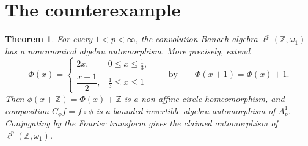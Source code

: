 \documentclass[11pt]{article}
\newtheorem{theorem}{Theorem}
\newcommand{\Z}{\mathbb Z}
\begin{document}
\section{The counterexample}

\begin{theorem}\label{thm:main}
For every $1<p<\infty$, the convolution Banach algebra
$\ell^p(\Z,\omega_1)$ has a noncanonical algebra automorphism.  More
precisely, extend
\[
 \Phi(x)=
 \begin{cases}
   2x,&0\le x\le \frac13,\\[2mm]
   \dfrac{x+1}{2},&\frac13\le x\le1
 \end{cases}
 \qquad\text{by}\qquad \Phi(x+1)=\Phi(x)+1.
\]
Then $\phi(x+\Z)=\Phi(x)+\Z$ is a non-affine circle homeomorphism, and
composition $C_\phi f=f\circ\phi$ is a bounded invertible algebra
automorphism of $A_p^1$.  Conjugating by the Fourier transform gives the
claimed automorphism of $\ell^p(\Z,\omega_1)$.
\end{theorem}
\end{document}
